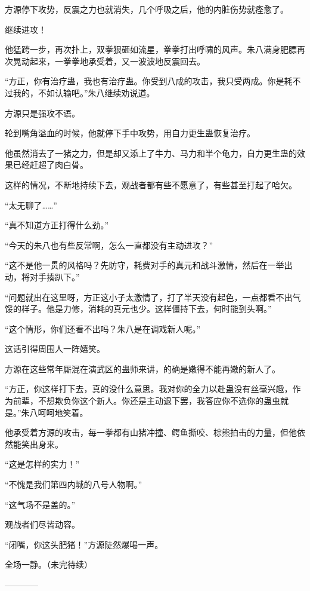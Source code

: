 \begin{this_body}
方源停下攻势，反震之力也就消失，几个呼吸之后，他的内脏伤势就痊愈了。

继续进攻！

他猛跨一步，再次扑上，双拳狠砸如流星，拳拳打出呼啸的风声。朱八满身肥膘再次晃动起来，一拳拳地承受着，又一波波地反震回去。

“方正，你有治疗蛊，我也有治疗蛊。你受到八成的攻击，我只受两成。你是耗不过我的，不如认输吧。”朱八继续劝说道。

方源只是强攻不语。

轮到嘴角溢血的时候，他就停下手中攻势，用自力更生蛊恢复治疗。

他虽然消去了一猪之力，但是却又添上了牛力、马力和半个龟力，自力更生蛊的效果已经赶超了肉白骨。

这样的情况，不断地持续下去，观战者都有些不愿意了，有些甚至打起了哈欠。

“太无聊了……”

“真不知道方正打得什么劲。”

“今天的朱八也有些反常啊，怎么一直都没有主动进攻？”

“这不是他一贯的风格吗？先防守，耗费对手的真元和战斗激情，然后在一举出动，将对手揍趴下。”

“问题就出在这里呀，方正这小子太激情了，打了半天没有起色，一点都看不出气馁的样子。他是力修，消耗的真元也少。这样僵持下去，何时能到头啊。”

“这个情形，你们还看不出吗？朱八是在调戏新人呢。”

这话引得周围人一阵嬉笑。

方源在这些常年厮混在演武区的蛊师来讲，的确是嫩得不能再嫩的新人了。

“方正，你这样打下去，真的没什么意思。我对你的全力以赴蛊没有丝毫兴趣，作为前辈，不想欺负你这个新人。你还是主动退下罢，我答应你不选你的蛊虫就是。”朱八呵呵地笑着。

他承受着方源的攻击，每一拳都有山猪冲撞、鳄鱼撕咬、棕熊拍击的力量，但他依然能笑出身来。

“这是怎样的实力！”

“不愧是我们第四内城的八号人物啊。”

“这气场不是盖的。”

观战者们尽皆动容。

“闭嘴，你这头肥猪！”方源陡然爆喝一声。

全场一静。（未完待续）

------------

\end{this_body}

